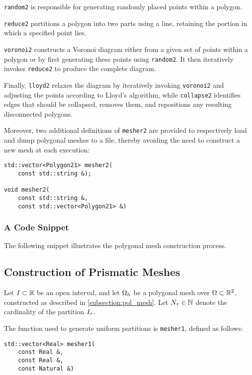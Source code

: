 \lstinline{random2} is responsible for generating randomly placed points within a polygon.

\lstinline{reduce2} partitions a polygon into two parts using a line, retaining the portion in which a specified point lies.

\lstinline{voronoi2} constructs a Voronoi diagram either from a given set of points within a polygon or by first generating these points using \lstinline{random2}. It then iteratively invokes \lstinline{reduce2} to produce the complete diagram.

Finally, \lstinline{lloyd2} relaxes the diagram by iteratively invoking \lstinline{voronoi2} and adjusting the points according to Lloyd's algorithm, while \lstinline{collapse2} identifies edges that should be collapsed, removes them, and repositions any resulting disconnected polygons.

\newpage
Moreover, two additional definitions of \lstinline{mesher2} are provided to respectively load and dump polygonal meshes to a file, thereby avoiding the need to construct a new mesh at each execution:
\begin{lstlisting}[style=cpp]
std::vector<Polygon21> mesher2(
    const std::string &);

void mesher2(
    const std::string &, 
    const std::vector<Polygon21> &)
\end{lstlisting}

\subsubsection{A Code Snippet}

The following snippet illustrates the polygonal mesh construction process.



\newpage
\subsection{Construction of Prismatic Meshes}

Let $I \subset \mathbb{R}$ be an open interval, and let $\Omega_{h}$ be a polygonal mesh over $\Omega \subset \mathbb{R}^{2}$, constructed as described in \cref{subsection:pol_mesh}. Let $N_{\tau} \in \mathbb{N}$ denote the cardinality of the partition $I_{\tau}$.

The function used to generate uniform partitions is \lstinline{mesher1}, defined as follows:
\begin{lstlisting}[style=cpp]
std::vector<Real> mesher1(
    const Real &, 
    const Real &, 
    const Natural &)
\end{lstlisting}

